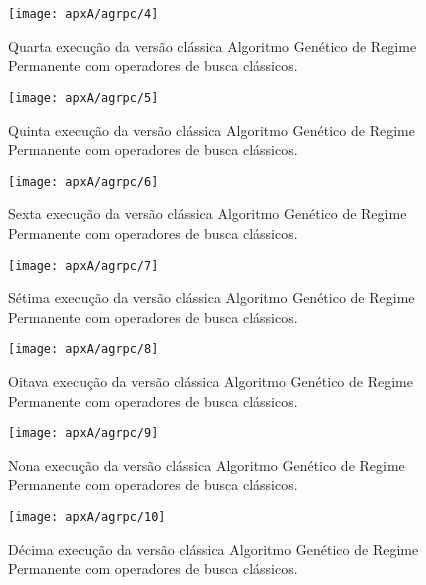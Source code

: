 \begin{figure}[H]
\centering
\texttt{[image: apxA/agrpc/4]}
\caption{Quarta execução da versão clássica Algoritmo Genético de Regime Permanente com operadores de busca clássicos.}
\label{fig:graphGRP1-04}
\end{figure}

\begin{figure}[H]
\centering
\texttt{[image: apxA/agrpc/5]}
\caption{Quinta execução da versão clássica Algoritmo Genético de Regime Permanente com operadores de busca clássicos.}
\label{fig:graphGRP1-05}
\end{figure}

\begin{figure}[H]
\centering
\texttt{[image: apxA/agrpc/6]}
\caption{Sexta execução da versão clássica Algoritmo Genético de Regime Permanente com operadores de busca clássicos.}
\label{fig:graphGRP1-06}
\end{figure}

\begin{figure}[H]
\centering
\texttt{[image: apxA/agrpc/7]}
\caption{Sétima execução da versão clássica Algoritmo Genético de Regime Permanente com operadores de busca clássicos.}
\label{fig:graphGRP1-07}
\end{figure}

\begin{figure}[H]
\centering
\texttt{[image: apxA/agrpc/8]}
\caption{Oitava execução da versão clássica Algoritmo Genético de Regime Permanente com operadores de busca clássicos.}
\label{fig:graphGRP1-08}
\end{figure}

\begin{figure}[H]
\centering
\texttt{[image: apxA/agrpc/9]}
\caption{Nona execução da versão clássica Algoritmo Genético de Regime Permanente com operadores de busca clássicos.}
\label{fig:graphGRP1-09}
\end{figure}

\begin{figure}[H]
\centering
\texttt{[image: apxA/agrpc/10]}
\caption{Décima execução da versão clássica Algoritmo Genético de Regime Permanente com operadores de busca clássicos.}
\label{fig:graphGRP1-10}
\end{figure}